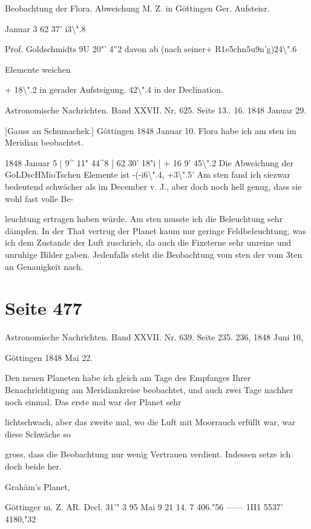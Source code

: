 \documentclass[10pt,a4paper]{article}
\begin{document}
Beobachtung der Flora. Abweichung M. Z. in Göttingen Ger. Aufsteisr.

Januar 3 62\textdegree{} 37' i3\textbackslash{}".8

Prof. Goldschmidts 9U 20"' 4''2 davon ab (nach seiner+ R1e5c\textdegree{}hn5u9n'g)24\textbackslash{}".6

Elemente weichen

+ 18\textbackslash{}".2 in gerader Aufsteigung. 42\textbackslash{}".4 in der Declination.

Astronomische Nachrichten. Band XXVII. Nr. 625. Seite 13.. 16. 1848 Januar 29.

[Gauss an Schumachek.] Göttingen 1848 Januar 10. Flora habe ich am sten im Meridian beobachtet.

1848 Januar 5 | 9\textasciicircum{} 11" 44\textasciicircum{}8 ] 62\textdegree{} 30' 18"i [ + 16\textdegree{} 9' 45\textbackslash{}".2 Die Abweichung der GoLDscHMioTschen Elemente ist -(-i6\textbackslash{}".4, +3\textbackslash{}".5' Am sten fand ich siezwar bedeutend schwächer als im December v. J., aber doch noch hell genug, dass sie wohl fast volle Be-

leuchtung ertragen haben würde. Am sten musste ich die Beleuchtung sehr dämpfen. In der That vertrug der Planet kaum nur geringe Feldbeleuchtung, was ich dem Zustande der Luft zuschrieb, da auch die Fixsterne sehr unreine und unruhige Bilder gaben. Jedenfalls steht die Beobachtung vom sten der vom 3ten an Genauigkeit nach.


\newpage
\section*{Seite 477}
Astronomische Nachrichten. Band XXVII. Nr. 639. Seite 235. 236, 1848 Juni 10,

Göttingen 1848 Mai 22.

Den neuen Planeten habe ich gleich am Tage des Empfanges Ihrer Benachrichtigung am Meridiankreise beobachtet, und auch zwei Tage nachher noch einmal. Das erste mal war der Planet sehr

lichtschwach, aber das zweite mal, wo die Luft mit Moorrauch erfüllt war, war diese Schwäche so

gross, dass die Beobachtung nur wenig Vertrauen verdient. Indessen setze ich doch beide her.

Grahäm's Planet,

Göttinger m. Z. AR. Decl. 31'" 3\textdegree{} 95 Mai 9 21 14. 7 406."56 —— 1II1\textdegree{} 5537' 4180,"32
\end{document}

